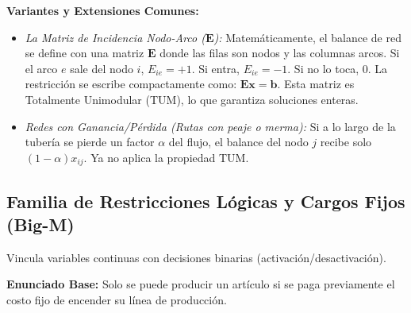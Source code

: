 \documentclass{article}
\begin{document}
	\textbf{Variantes y Extensiones Comunes:}
	\begin{itemize}
		\item \textit{La Matriz de Incidencia Nodo-Arco ($\mathbf{E}$):} Matemáticamente, el balance de red se define con una matriz $\mathbf{E}$ donde las filas son nodos y las columnas arcos. Si el arco $e$ sale del nodo $i$, $E_{ie} = +1$. Si entra, $E_{ie} = -1$. Si no lo toca, $0$. La restricción se escribe compactamente como: $\mathbf{E x} = \mathbf{b}$. Esta matriz es Totalmente Unimodular (TUM), lo que garantiza soluciones enteras.
		\item \textit{Redes con Ganancia/Pérdida (Rutas con peaje o merma):} Si a lo largo de la tubería se pierde un factor $\alpha$ del flujo, el balance del nodo $j$ recibe solo $(1-\alpha)x_{ij}$. Ya no aplica la propiedad TUM.
	\end{itemize}
	
	\newpage
	
	\subsection{Familia de Restricciones Lógicas y Cargos Fijos (Big-M)}
	Vincula variables continuas con decisiones binarias (activación/desactivación).
	
	\textbf{Enunciado Base:} Solo se puede producir un artículo si se paga previamente el costo fijo de encender su línea de producción.
	
\end{document}
